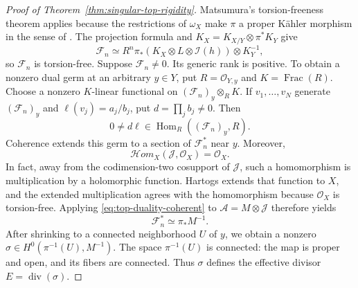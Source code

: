 \documentclass[11pt,reqno]{amsart}
\numberwithin{equation}{section}
\theoremstyle{definition}
\theoremstyle{remark}
\begin{document}
\begin{proof}[Proof of Theorem~\ref{thm:singular-top-rigidity}]
Matsumura's torsion-freeness theorem
\cite[Corollary~1.5]{Mat22} applies because the restrictions of
$\omega_X$ make $\pi$ a proper K\"ahler morphism in the sense of
\cite[Remark~1.4(1)]{Mat22}.  The projection formula and
$K_X=K_{X/Y}\otimes\pi^*K_Y$ give
\[
 \mathcal F_n\simeq
 R^n\pi_*(K_X\otimes L\otimes\mathcal I(h))\otimes K_Y^{-1},
\]
so $\mathcal F_n$ is torsion-free.
Suppose $\mathcal F_n\ne0$. Its generic rank is positive. To obtain a
nonzero dual germ at an arbitrary $y\in Y$, put $R=\mathcal O_{Y,y}$
and $K=\operatorname{Frac}(R)$. Choose a nonzero $K$-linear functional
on $(\mathcal F_n)_y\otimes_R K$. If $v_1,\ldots,v_N$ generate
$(\mathcal F_n)_y$ and $\ell(v_j)=a_j/b_j$, put $d=\prod_jb_j\ne0$.
Then
\[
 0\ne d\ell\in\operatorname{Hom}_R((\mathcal F_n)_y,R).
\]
Coherence extends this germ to a section of $\mathcal F_n^*$ near $y$.
Moreover,
\[
 \mathcal Hom_X(\mathcal J,\mathcal O_X)=\mathcal O_X.
\]
In fact, away from the codimension-two cosupport of $\mathcal J$,
such a homomorphism is multiplication by a holomorphic function.
Hartogs extends that function to $X$, and the extended multiplication
agrees with the homomorphism because $\mathcal O_X$ is torsion-free.
Applying \eqref{eq:top-duality-coherent} to $\mathcal A=M\otimes\mathcal J$
therefore yields
\begin{equation}\label{eq:top-dual-section}
 \mathcal F_n^*\simeq\pi_*M^{-1}.
\end{equation}
After shrinking to a connected neighborhood $U$ of $y$, we obtain
a nonzero $\sigma\in H^0(\pi^{-1}(U),M^{-1})$.
The space $\pi^{-1}(U)$ is connected: the map is proper and open,
and its fibers are connected.  Thus $\sigma$ defines the effective divisor
$E=\operatorname{div}(\sigma)$.


\end{proof}
\end{document}
